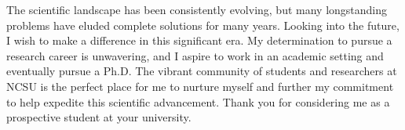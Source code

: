\documentclass{article}
\begin{document}
  \vspace{5pt}
\hspace{0.25in}The scientific landscape has been consistently evolving, but many longstanding
problems have eluded complete solutions for many years. Looking into the future,
I wish to make a difference in this significant era. My determination to pursue
a research career is unwavering, and I aspire to work in an academic setting and
eventually pursue a Ph.D. The vibrant community of students and researchers at
NCSU is the perfect place for me to nurture myself and further my commitment to
help expedite this scientific advancement. Thank you for considering me as a
prospective student at your university.
\end{document}
